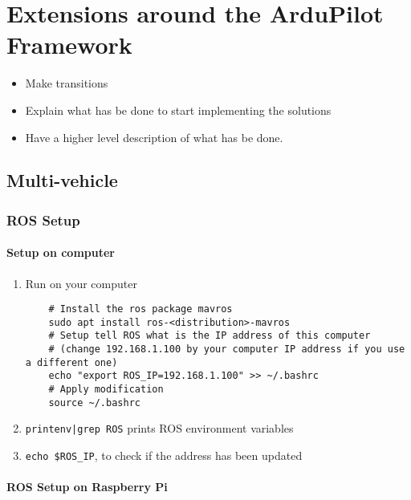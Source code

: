 \chapter{Extensions around the ArduPilot Framework}

{\color{red}
\begin{itemize}
    \item Make transitions
    \item Explain what has be done to start implementing the solutions
    \item Have a higher level description of what has be done.
\end{itemize}
}

\section{Multi-vehicle}

\subsection{ROS Setup}
\subsubsection{Setup on computer}
\begin{enumerate}
    \item Run on your computer

          \begin{verbatim}
    # Install the ros package mavros
    sudo apt install ros-<distribution>-mavros
    # Setup tell ROS what is the IP address of this computer
    # (change 192.168.1.100 by your computer IP address if you use a different one)
    echo "export ROS_IP=192.168.1.100" >> ~/.bashrc
    # Apply modification
    source ~/.bashrc
                    \end{verbatim}
    \item \texttt{printenv|grep ROS} prints ROS environment variables
    \item \texttt{echo \$ROS\_IP}, to check if the address has been updated
\end{enumerate}

\subsubsection{ROS Setup on Raspberry Pi}

